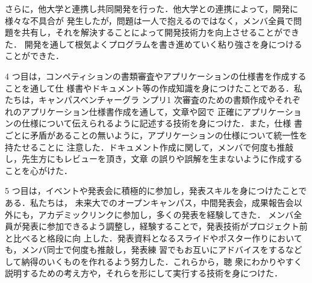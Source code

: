 さらに，他大学と連携し共同開発を行った．他大学との連携によって，開発に様々な不具合が
発生したが，問題は一人で抱えるのではなく，メンバ全員で問題を共有し，それを解決することによって開発技術力を向上させることができた．
開発を通して根気よくプログラムを書き進めていく粘り強さを身につけることができた．
\par
4 つ目は，コンペティションの書類審査やアプリケーションの仕様書を作成することを通して仕
様書やドキュメント等の作成知識を身につけたことである．私たちは，キャンパスベンチャーグラ
ンプリ1 次審査のための書類作成やそれぞれのアプリケーション仕様書作成を通して，文章や図で
正確にアプリケーションの仕様について伝えられるように記述する技術を身につけた．また，仕様
書ごとに矛盾があることの無いように，アプリケーションの仕様について統一性を持たせることに
注意した．ドキュメント作成に関して，メンバで何度も推敲し，先生方にもレビューを頂き，文章
の誤りや誤解を生まないように作成することを心がけた．
\par
5 つ目は，イベントや発表会に積極的に参加し，発表スキルを身につけたことである．私たちは，
未来大でのオープンキャンパス，中間発表会，成果報告会以外にも，アカデミックリンクに参加し，多くの発表を経験してきた．
メンバ全員が発表に参加できるよう調整し，経験することで，発表技術がプロジェクト前と比べると格段に向
上した．発表資料となるスライドやポスター作りにおいても，メンバ同士で何度も推敲し，発表練
習でもお互いにアドバイスをするなどして納得のいくものを作れるよう努力した．これらから，聴
衆にわかりやすく説明するための考え方や，それらを形にして実行する技術を身につけた．
